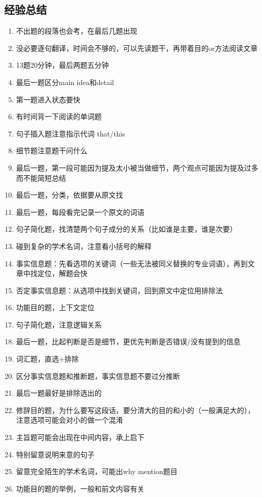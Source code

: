 \documentclass[UTF8]{ctexart}
\begin{document}
\subsection{经验总结}
\begin{enumerate}[A]
  \item 不出题的段落也会考，在最后几题出现
  \item 没必要逐句翻译，时间会不够的，可以先读题干，再带着目的or方法阅读文章
  \item 13题20分钟，最后两题五分钟
  \item 最后一题区分main idea和detail
  \item 第一题进入状态要快
  \item 有时间背一下阅读的单词题
  \item 句子插入题注意指示代词 that/this
  \item 细节题注意题干问什么
  \item 最后一题，第一段可能因为提及太小被当做细节，两个观点可能因为提及过多而不能简短总结
  \item 最后一题，分类，依据要从原文找
  \item 最后一题，每段看完记录一个原文的词语
  \item 句子简化题，找清楚两个句子成分的关系（比如谁是主要，谁是次要）
  \item 碰到复杂的学术名词，注意看小括号的解释
  \item 事实信息题：先看选项的关键词（一些无法被同义替换的专业词语），再到文章中找定位，解题会快
  \item 否定事实信息题：从选项中找到关键词，回到原文中定位用排除法
  \item 功能目的题，上下文定位
  \item 句子简化题，注意逻辑关系
  \item 最后一题，比起判断是否是细节，更优先判断是否错误/没有提到的信息
  \item 词汇题，直选+排除
  \item 区分事实信息题和推断题，事实信息题不要过分推断
  \item 最后一题最好是排除选出的
  \item 修辞目的题，为什么要写这段话，要分清大的目的和小的（一般满足大的），注意选项可能会对小的做一个混淆
  \item 主旨题可能会出现在中间内容，承上启下
  \item 特别留意说明来意的句子
  \item 留意完全陌生的学术名词，可能出why mention题目
  \item 功能目的题的举例，一般和前文内容有关
  \end{enumerate}
\end{document}
